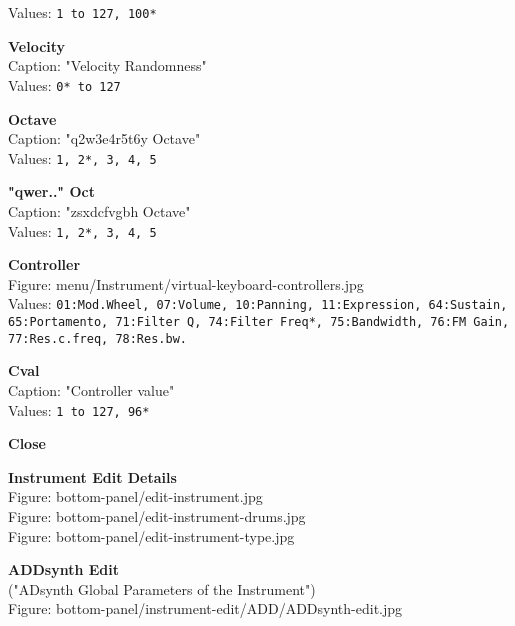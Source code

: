 \documentclass[
 11pt,
 twoside,
 a4paper,
 headinclude,
 footinclude,
 final                                 %
]{article}
\begin{document}
\begin{enumber}
\begin{enumber}
            Values: \texttt{1 to 127, 100*}
         \item \textbf{Velocity} \\
            Caption: "Velocity Randomness" \\
            Values: \texttt{0* to 127}
         \item \textbf{Octave} \\
            Caption: "q2w3e4r5t6y Octave" \\
            Values: \texttt{1, 2*, 3, 4, 5}
         \item \textbf{"qwer.." Oct} \\
            Caption: "zsxdcfvgbh Octave" \\
            Values: \texttt{1, 2*, 3, 4, 5}
         \item \textbf{Controller} \\
            Figure: menu/Instrument/virtual-keyboard-controllers.jpg \\
            Values: \texttt{01:Mod.Wheel, 07:Volume, 10:Panning,
               11:Expression, 64:Sustain, 65:Portamento, 71:Filter Q,
               74:Filter Freq*, 75:Bandwidth, 76:FM Gain,
               77:Res.c.freq, 78:Res.bw.}
         \item \textbf{Cval} \\
            Caption: "Controller value" \\
            Values: \texttt{1 to 127, 96*}
         \item \textbf{Close}
      \end{enumber}
   \item \textbf{Instrument Edit Details} \\
      Figure: bottom-panel/edit-instrument.jpg \\
      Figure: bottom-panel/edit-instrument-drums.jpg \\
      Figure: bottom-panel/edit-instrument-type.jpg
   \begin{enumber}
      \item \textbf{ADDsynth Edit} \\
         ("ADsynth Global Parameters of the Instrument") \\
         Figure: bottom-panel/instrument-edit/ADD/ADDsynth-edit.jpg
      \begin{enumber}



\end{enumber}
\end{enumber}
\end{enumber}
\end{document}
